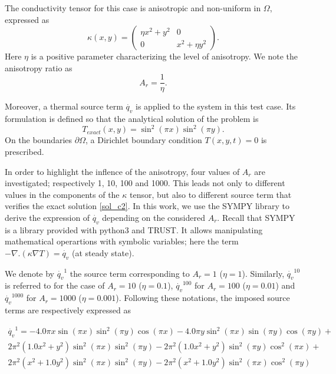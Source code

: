 The conductivity tensor for this case is anisotropic and non-uniform in $\Omega$, expressed as
\begin{equation}\label{tensor_c2}
\kappa(x,y)=\left(\begin{matrix} \eta x^2 +y^2 & 0 \\ 0 & x^2 + \eta y^2 \end{matrix}\right). 
\end{equation}
Here $\eta$ is a positive parameter characterizing the level of anisotropy. We note the anisotropy ratio as
\begin{equation}
A_r=\frac{1}{\eta}.
\end{equation}

Moreover, a thermal source term $\dot{q_v}$ is applied to the system in this test case. Its formulation is defined so that the analytical solution of the problem is 
\begin{equation}\label{sol_c2}
T_{exact}(x,y)=\sin^2(\pi x)\sin^2(\pi y).
\end{equation}
On the boundaries $\partial \Omega$, a Dirichlet boundary condition $T(x,y,t)=0$ is prescribed. 

In order to highlight the inflence of the anisotropy, four values of $A_r$ are investigated; respectively 1, 10, 100 and 1000. This leads not only to different values in the components of the $\kappa$ tensor, but also to different source term that verifies the exact solution \eqref{sol_c2}. In this work, we use the SYMPY library to derive the expression of $\dot{q_v}$ depending on the considered $A_r$. Recall that SYMPY is a library provided with python3 and TRUST. It allows manipulating mathematical operartions with symbolic variables; here the term $-\nabla.(\kappa \nabla T)=\dot{q_v}$ (at steady state). 

We denote by $\dot{q_v}^1$ the source term corresponding to $A_r=1$ ($\eta=1$). Similarly, $\dot{q_v}^{10}$ is referred to for the case of $A_r=10$ ($\eta=0.1$), $\dot{q_v}^{100}$ for $A_r=100$ ($\eta=0.01$) and $\dot{q_v}^{1000}$ for $A_r=1000$ ($\eta=0.001$). Following these notations, the imposed source terms are respectively expressed as

\begin{multline}
\dot{q_v}^1=- 4.0 \pi x \sin{\left(\pi x \right)} \sin^{2}{\left(\pi y \right)} \cos{\left(\pi x \right)} - 4.0 \pi y \sin^{2}{\left(\pi x \right)} \sin{\left(\pi y \right)} \cos{\left(\pi y \right)} + \\2 \pi^{2} \left(1.0 x^{2} + y^{2}\right) \sin^{2}{\left(\pi x \right)} \sin^{2}{\left(\pi y \right)} - 2 \pi^{2} \left(1.0 x^{2} + y^{2}\right) \sin^{2}{\left(\pi y \right)} \cos^{2}{\left(\pi x \right)} + \\2 \pi^{2} \left(x^{2} + 1.0 y^{2}\right) \sin^{2}{\left(\pi x \right)} \sin^{2}{\left(\pi y \right)} - 2 \pi^{2} \left(x^{2} + 1.0 y^{2}\right) \sin^{2}{\left(\pi x \right)} \cos^{2}{\left(\pi y \right)}
\end{multline}

